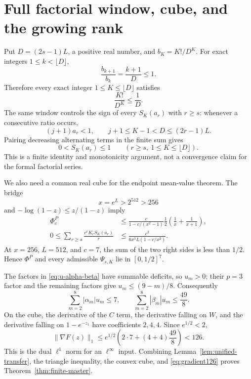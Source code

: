 \documentclass[11pt]{article}
\theoremstyle{definition}
\theoremstyle{remark}
\newcommand{\PhiP}{\Phi^{P}}
\begin{document}
\section{Full factorial window, cube, and the growing rank}

Put $D=(2s-1)L$, a positive real number, and
$b_K=K!/D^K$.  For exact integers $1\le k<\lfloor D\rfloor$,
\begin{equation}
 \frac{b_{k+1}}{b_k}=\frac{k+1}{D}\le1.
 \label{eq:b-recurrence}
\end{equation}
Therefore every exact integer $1\le K\le\lfloor D\rfloor$ satisfies
\begin{equation}
 \frac{K!}{D^K}\le\frac1D.
 \label{eq:full-window}
\end{equation}
The same window controls the sign of every $S_K(a_r)$ with $r\ge s$:
whenever a consecutive ratio occurs,
\[
 (j+1)a_r<1,\qquad
 j+1\le K-1<D\le(2r-1)L.
\]
Pairing decreasing alternating terms in the finite sum gives
\begin{equation}
 0<S_K(a_r)\le1
 \qquad(r\ge s,\ 1\le K\le\lfloor D\rfloor).
 \label{eq:alternating-positive}
\end{equation}
This is a finite identity and monotonicity argument, not a convergence
claim for the formal factorial series.

We also need a common real cube for the endpoint mean-value theorem.
The bridge
\begin{equation}
 x=e^L>2^{512}>256
 \label{eq:cube-bridge}
\end{equation}
and $-\log(1-z)\le z/(1-z)$ imply
\begin{align}
 \PhiP_c
 &\le\frac{c}{1-c/(x^2-1)}
 \frac12\left(\frac1x+\frac1{x+1}\right),
 \label{eq:prime-cube}\\
 0\le\sum_{r\ge s}\frac{c^rK_rS_K(a_r)}r
 &\le\frac{c^2}{6x^3L(1-c/x^2)}.
 \label{eq:factorial-cube}
\end{align}
At $x=256$, $L=512$, and $c=7$, the sum of the two right sides is
less than $1/2$.  Hence $\PhiP$ and every admissible $\Psi_{s,K}$ lie
in $[0,1/2]^7$.

The factors in \eqref{eq:u-alpha-beta} have summable deficits, so
$u_m>0$; their $p=3$ factor and the remaining factors give
$u_m\le(9-m)/8$.  Consequently
\begin{equation}
 \sum_{m=2}^8|\alpha_m|u_m\le7,\qquad
 \sum_{m=2}^8|\beta_m|u_m\le\frac{49}{8}.
 \label{eq:endpoint-arrays}
\end{equation}
On the cube, the derivative of the $C$ term, the derivative falling on
$W$, and the derivative falling on $1-e^{-z_1}$ have coefficients
$2,4,4$.  Since $e^{1/2}<2$,
\begin{equation}
 \|\nabla F(z)\|_1
 \le e^{1/2}\left(2\cdot7+(4+4)\frac{49}{8}\right)<126.
 \label{eq:gradient126}
\end{equation}
This is the dual $\ell^1$ norm for an $\ell^\infty$ input.  Combining
Lemma~\ref{lem:unified-transfer}, the triangle inequality, the convex
cube, and \eqref{eq:gradient126} proves
Theorem~\ref{thm:finite-master}.
\end{document}
